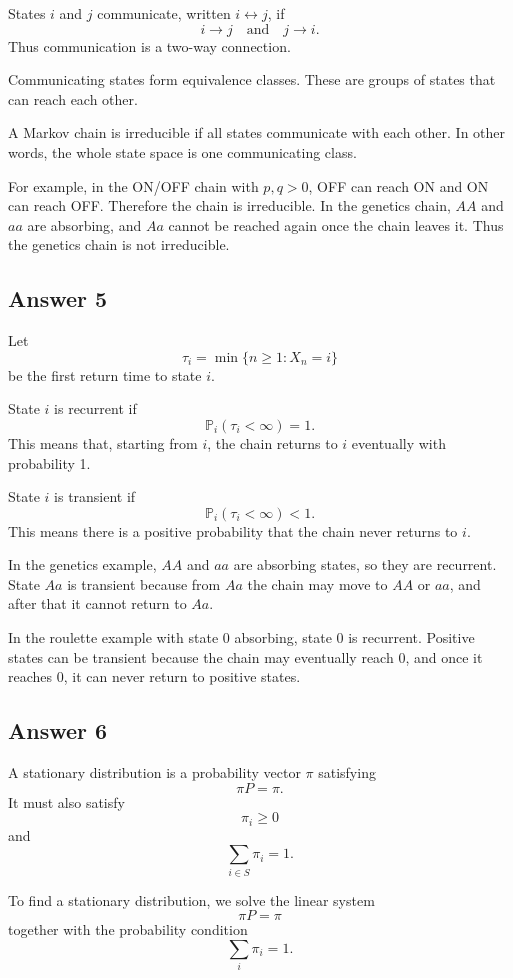 \documentclass[12pt,a4paper]{article}
\theoremstyle{lecturestyle}
\newcommand{\Prob}{\mathbb{P}}
\begin{document}
States $i$ and $j$ communicate, written $i\leftrightarrow j$, if
\[
i\to j
\quad\text{and}\quad
j\to i.
\]
Thus communication is a two-way connection.

Communicating states form equivalence classes. These are groups of states that can reach each other.

A Markov chain is irreducible if all states communicate with each other. In other words, the whole state space is one communicating class.

For example, in the ON/OFF chain with $p,q>0$, OFF can reach ON and ON can reach OFF. Therefore the chain is irreducible. In the genetics chain, $AA$ and $aa$ are absorbing, and $Aa$ cannot be reached again once the chain leaves it. Thus the genetics chain is not irreducible.

\subsection*{Answer 5}

Let
\[
\tau_i=\min\{n\geq1:X_n=i\}
\]
be the first return time to state $i$.

State $i$ is recurrent if
\[
\Prob_i(\tau_i<\infty)=1.
\]
This means that, starting from $i$, the chain returns to $i$ eventually with probability 1.

State $i$ is transient if
\[
\Prob_i(\tau_i<\infty)<1.
\]
This means there is a positive probability that the chain never returns to $i$.

In the genetics example, $AA$ and $aa$ are absorbing states, so they are recurrent. State $Aa$ is transient because from $Aa$ the chain may move to $AA$ or $aa$, and after that it cannot return to $Aa$.

In the roulette example with state $0$ absorbing, state $0$ is recurrent. Positive states can be transient because the chain may eventually reach $0$, and once it reaches $0$, it can never return to positive states.

\subsection*{Answer 6}

A stationary distribution is a probability vector $\pi$ satisfying
\[
\pi P=\pi.
\]
It must also satisfy
\[
\pi_i\geq0
\]
and
\[
\sum_{i\in S}\pi_i=1.
\]

To find a stationary distribution, we solve the linear system
\[
\pi P=\pi
\]
together with the probability condition
\[
\sum_i\pi_i=1.
\]
\end{document}
